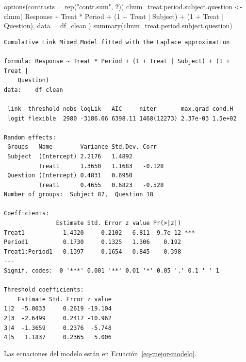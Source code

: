 \documentclass[
  12pt,
  a4paper,
  extrafontsizes,
  onecolumn,
  openright,
  table]{memoir}
\newenvironment{Shaded}{\begin{snugshade}}{\end{snugshade}}
\newcommand{\AttributeTok}[1]{\textcolor[rgb]{0.40,0.45,0.13}{#1}}
\newcommand{\DecValTok}[1]{\textcolor[rgb]{0.68,0.00,0.00}{#1}}
\newcommand{\FunctionTok}[1]{\textcolor[rgb]{0.28,0.35,0.67}{#1}}
\newcommand{\NormalTok}[1]{\textcolor[rgb]{0.00,0.23,0.31}{#1}}
\newcommand{\OtherTok}[1]{\textcolor[rgb]{0.00,0.23,0.31}{#1}}
\newcommand{\SpecialCharTok}[1]{\textcolor[rgb]{0.37,0.37,0.37}{#1}}
\newcommand{\StringTok}[1]{\textcolor[rgb]{0.13,0.47,0.30}{#1}}
\begin{document}
\begin{Shaded}
\begin{Highlighting}[]
\FunctionTok{options}\NormalTok{(}\AttributeTok{contrasts =} \FunctionTok{rep}\NormalTok{(}\StringTok{"contr.sum"}\NormalTok{, }\DecValTok{2}\NormalTok{))}
\NormalTok{clmm\_treat.period.subject.question }\OtherTok{\textless{}{-}} \FunctionTok{clmm}\NormalTok{(}
\NormalTok{    Response }\SpecialCharTok{\textasciitilde{}}\NormalTok{ Treat }\SpecialCharTok{*}\NormalTok{ Period }\SpecialCharTok{+}\NormalTok{ (}\DecValTok{1} \SpecialCharTok{+}\NormalTok{ Treat }\SpecialCharTok{|}\NormalTok{ Subject) }\SpecialCharTok{+}\NormalTok{ (}\DecValTok{1} \SpecialCharTok{+}\NormalTok{ Treat }\SpecialCharTok{|}\NormalTok{ Question),}
    \AttributeTok{data =}\NormalTok{ df\_clean}
\NormalTok{)}
\FunctionTok{summary}\NormalTok{(clmm\_treat.period.subject.question)}
\end{Highlighting}
\end{Shaded}

\begin{verbatim}
Cumulative Link Mixed Model fitted with the Laplace approximation

formula: Response ~ Treat * Period + (1 + Treat | Subject) + (1 + Treat |  
    Question)
data:    df_clean

 link  threshold nobs logLik   AIC     niter       max.grad cond.H 
 logit flexible  2980 -3186.06 6398.11 1468(12273) 2.37e-03 1.5e+02

Random effects:
 Groups   Name        Variance Std.Dev. Corr   
 Subject  (Intercept) 2.2176   1.4892          
          Treat1      1.3650   1.1683   -0.128 
 Question (Intercept) 0.4831   0.6950          
          Treat1      0.4655   0.6823   -0.528 
Number of groups:  Subject 87,  Question 18 

Coefficients:
               Estimate Std. Error z value Pr(>|z|)    
Treat1           1.4320     0.2102   6.811  9.7e-12 ***
Period1          0.1730     0.1325   1.306    0.192    
Treat1:Period1   0.1397     0.1654   0.845    0.398    
---
Signif. codes:  0 '***' 0.001 '**' 0.01 '*' 0.05 '.' 0.1 ' ' 1

Threshold coefficients:
    Estimate Std. Error z value
1|2  -5.0033     0.2619 -19.104
2|3  -2.6499     0.2417 -10.962
3|4  -1.3659     0.2376  -5.748
4|5   1.1837     0.2365   5.006
\end{verbatim}

\normalsize

Las ecuaciones del modelo están en Ecuación~\ref{eq-mejor-modelo}.
\end{document}
